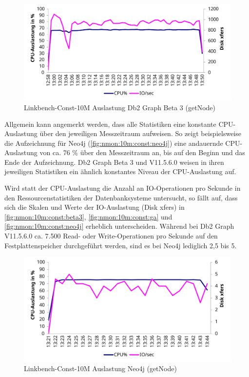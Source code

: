 \begin{figure}[!ht]
    \centering
    \includegraphics[width=\textwidth]{images/stats/linkbench-10m-const_beta3.pdf}
    \caption{Linkbench-Const-10M Auslastung Db2 Graph Beta 3 (getNode)}
    \label{fig:nmon:10m:const:beta3}
\end{figure}

Allgemein kann angemerkt werden, dass alle Statistiken eine konstante CPU-Auslastung über den jeweiligen Messzeitraum aufweisen. So zeigt beispielsweise die Aufzeichnung für Neo4j (\autoref{fig:nmon:10m:const:neo4j}) eine andauernde CPU-Auslastung von ca. 76 \% über den Messzeitraum an, bis auf den Beginn und das Ende der Aufzeichnung. Db2 Graph Beta 3 und V11.5.6.0 weisen in ihren jeweiligen Statistiken ein ähnlich konstantes Niveau der CPU-Auslastung auf. 

Wird statt der CPU-Auslastung die Anzahl an IO-Ope\-ra\-ti\-on\-en pro Sekunde in den Ressourcenstatistiken der Datenbanksysteme untersucht, so fällt auf, dass sich die Skalen und Werte der IO-Aus\-last\-ung (Disk xfers) in \autoref{fig:nmon:10m:const:beta3}, \autoref{fig:nmon:10m:const:ga} und \autoref{fig:nmon:10m:const:neo4j} erheblich unterscheiden. Während bei Db2 Graph V11.5.6.0 ca. 7.500 Read- oder Write-Ope\-ra\-ti\-on\-en pro Sekunde auf den Festplattenspeicher durchgeführt werden, sind es bei Neo4j lediglich 2,5 bis 5. 

\begin{figure}[!ht]
    \centering
    \includegraphics[width=\textwidth]{images/stats/linkbench-10m-const_neo4j.pdf}
    \caption{Linkbench-Const-10M Auslastung Neo4j (getNode)}
    \label{fig:nmon:10m:const:neo4j}
\end{figure}

